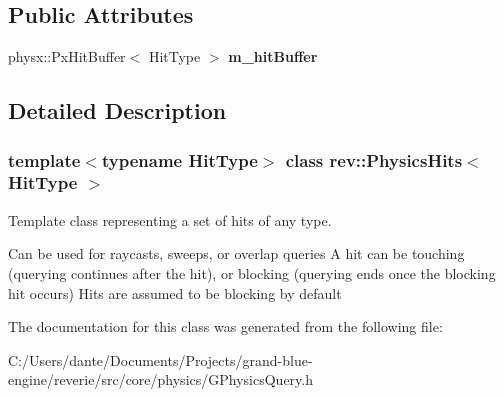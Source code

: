 \subsection*{Public Attributes}
\begin{DoxyCompactItemize}
\item 
\mbox{\label{classrev_1_1_physics_hits_a1f1ea4d94cab55e4608b93b4a9912785}} 
physx\+::\+Px\+Hit\+Buffer$<$ Hit\+Type $>$ {\bfseries m\+\_\+hit\+Buffer}
\end{DoxyCompactItemize}


\subsection{Detailed Description}
\subsubsection*{template$<$typename Hit\+Type$>$\newline
class rev\+::\+Physics\+Hits$<$ Hit\+Type $>$}

Template class representing a set of hits of any type. 

Can be used for raycasts, sweeps, or overlap queries A hit can be touching (querying continues after the hit), or blocking (querying ends once the blocking hit occurs) Hits are assumed to be blocking by default 

The documentation for this class was generated from the following file\+:\begin{DoxyCompactItemize}
\item 
C\+:/\+Users/dante/\+Documents/\+Projects/grand-\/blue-\/engine/reverie/src/core/physics/G\+Physics\+Query.\+h\end{DoxyCompactItemize}
